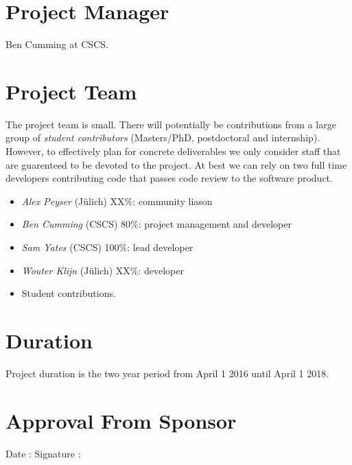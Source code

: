 \documentclass[11pt,a4paper]{article}
\newcommand{\julich}[0]{J\"ulich\xspace}
\begin{document}
\section{Project Manager}
Ben Cumming at CSCS.

\section{Project Team}

The project team is small.
There will potentially be contributions from a large group of \emph{student contributors} (Masters/PhD, postdoctoral and internship).
However, to effectively plan for concrete deliverables we only consider staff that are guarenteed to be devoted to the project.
At best we can rely on two full time developers contributing code that passes code review to the software product.

\begin{itemize}
    \item \emph{Alex Peyser} (\julich) XX\%: community liason
    \item \emph{Ben Cumming} (CSCS) 80\%: project management and developer
    \item \emph{Sam Yates} (CSCS) 100\%: lead developer
    \item \emph{Wouter Klijn} (\julich) XX\%: developer
    \item Student contributions.
\end{itemize}

\section{Duration}
Project duration is the two year period from April 1 2016 until April 1 2018.

\section{Approval From Sponsor}
\vspace{20pt}
Date :\hspace{5cm} Signature :
\end{document}
